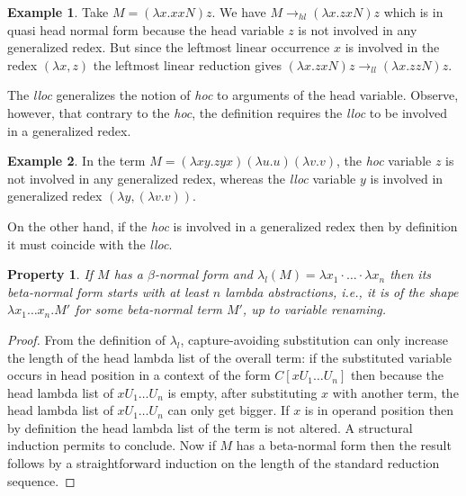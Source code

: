 \documentclass{elsarticle}
\makeatletter
\theoremstyle{plain}
\newtheorem{property}[theorem]{Property}
\theoremstyle{definition}
\newtheorem{example}{Example}[section]
\renewcommand\ie{{\it i.e.\@\xspace}}
\newcommand{\hlred}{\rightarrow_{hl}}
\newcommand{\llred}{\rightarrow_{ll}}
\makeatother
\begin{document}
\begin{example}
Take $M = (\lambda x. x x N) z$. We have $M \hlred (\lambda x. z x N) z$ which is in quasi head normal form because the head variable $z$ is not involved in any generalized redex.
But since the leftmost linear occurrence $x$ is involved in the redex $(\lambda x, z)$ the leftmost linear reduction gives $(\lambda x. z x N) z \llred (\lambda x. z z N) z$.
\end{example}

The \emph{lloc} generalizes the notion of \emph{hoc} to arguments of the head variable. Observe, however, that contrary to the \emph{hoc}, the definition requires the \emph{lloc} to be involved in a generalized redex.
\begin{example}In the term $M = (\lambda x y . z y x) (\lambda u . u) (\lambda v . v)$, the \emph{hoc} variable $z$ is not involved in any generalized redex, whereas the \emph{lloc} variable $y$ is involved in generalized redex $(\lambda y, (\lambda v.v))$.
\end{example}
On the other hand, if the \emph{hoc} is involved in a generalized redex then by definition it must coincide with the \emph{lloc}.

\begin{property}
If $M$ has a $\beta$-normal form and $\lambda_l(M) = \lambda x_1 \cdot \ldots \cdot \lambda x_n$ then its beta-normal form starts with at least $n$ lambda abstractions, \ie, it is of the shape $\lambda x_1 \ldots x_n . M'$ for some beta-normal term $M'$, up to variable renaming.
\end{property}
\begin{proof}
From the definition of $\lambda_l$, capture-avoiding substitution can only increase the length of the head lambda list of the overall term: if the substituted variable occurs in head position in a context of the form $C[x U_1 \ldots U_n]$ then because the head lambda list of $x U_1 \ldots U_n$ is empty, after substituting $x$ with another term, the head lambda list of $x U_1 \ldots U_n$ can only get bigger. If $x$ is in operand position then by definition the head lambda list of the term is not altered. A structural induction permits to conclude.
Now if $M$ has a beta-normal form then the result follows by a straightforward induction on the length of the standard reduction sequence.
\end{proof}
\end{document}
